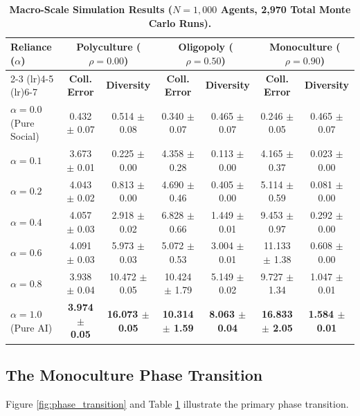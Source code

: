 \documentclass[10pt,twocolumn]{article}
\begin{document}
\begin{table}[t]
\centering
\small
\setlength{\tabcolsep}{3.5pt}
\caption{\textbf{Macro-Scale Simulation Results ($N = 1,000$ Agents, 2,970 Total Monte Carlo Runs).}}
\begin{tabular}{@{}lcccccc@{}}
\toprule
\textbf{Reliance ($\alpha$)} & \multicolumn{2}{c}{\textbf{Polyculture ($\rho = 0.00$)}} & \multicolumn{2}{c}{\textbf{Oligopoly ($\rho = 0.50$)}} & \multicolumn{2}{c}{\textbf{Monoculture ($\rho = 0.90$)}} \\
\cmidrule(lr){2-3} \cmidrule(lr){4-5} \cmidrule(lr){6-7}
& \textbf{Coll. Error} & \textbf{Diversity} & \textbf{Coll. Error} & \textbf{Diversity} & \textbf{Coll. Error} & \textbf{Diversity} \\
\midrule
$\alpha = 0.0$ (Pure Social)   & 0.432 $\pm$ 0.07 & 0.514 $\pm$ 0.08 & 0.340 $\pm$ 0.07 & 0.465 $\pm$ 0.07 & 0.246 $\pm$ 0.05 & 0.465 $\pm$ 0.07 \\
$\alpha = 0.1$                 & 3.673 $\pm$ 0.01 & 0.225 $\pm$ 0.00 & 4.358 $\pm$ 0.28 & 0.113 $\pm$ 0.00 & 4.165 $\pm$ 0.37 & 0.023 $\pm$ 0.00 \\
$\alpha = 0.2$                 & 4.043 $\pm$ 0.02 & 0.813 $\pm$ 0.00 & 4.690 $\pm$ 0.46 & 0.405 $\pm$ 0.00 & 5.114 $\pm$ 0.59 & 0.081 $\pm$ 0.00 \\
$\alpha = 0.4$                 & 4.057 $\pm$ 0.03 & 2.918 $\pm$ 0.02 & 6.828 $\pm$ 0.66 & 1.449 $\pm$ 0.01 & 9.453 $\pm$ 0.97 & 0.292 $\pm$ 0.00 \\
$\alpha = 0.6$                 & 4.091 $\pm$ 0.03 & 5.973 $\pm$ 0.03 & 5.072 $\pm$ 0.53 & 3.004 $\pm$ 0.01 & 11.133 $\pm$ 1.38 & 0.608 $\pm$ 0.00 \\
$\alpha = 0.8$                 & 3.938 $\pm$ 0.04 & 10.472 $\pm$ 0.05 & 10.424 $\pm$ 1.79 & 5.149 $\pm$ 0.02 & 9.727 $\pm$ 1.34 & 1.047 $\pm$ 0.01 \\
$\alpha = 1.0$ (Pure AI)       & \textbf{3.974 $\pm$ 0.05} & \textbf{16.073 $\pm$ 0.05} & \textbf{10.314 $\pm$ 1.59} & \textbf{8.063 $\pm$ 0.04} & \textbf{16.833 $\pm$ 2.05} & \textbf{1.584 $\pm$ 0.01} \\
\bottomrule
\end{tabular}
\label{tab:macro_results}
\end{table}

\subsection{The Monoculture Phase Transition}
Figure \ref{fig:phase_transition} and Table \ref{tab:macro_results} illustrate the primary phase transition. 
\end{document}
